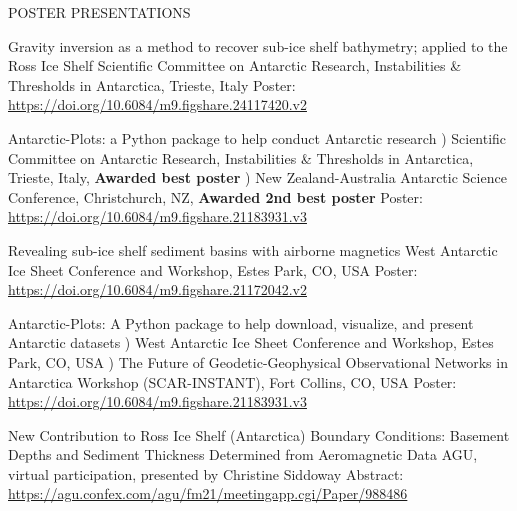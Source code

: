 \documentclass{ExpressiveResume}
\begin{document}
\noindent POSTER PRESENTATIONS \newline
\begin{cventries}

    {Gravity inversion as a method to recover sub-ice shelf bathymetry; applied to the Ross Ice Shelf}
    {Scientific Committee on Antarctic Research, Instabilities \&
        Thresholds in Antarctica, Trieste, Italy}
    {Poster: \url{https://doi.org/10.6084/m9.figshare.24117420.v2}}
    {}
    {}

    \talk{}
    {Antarctic-Plots: a Python package to help conduct Antarctic research}
    {) Scientific Committee on Antarctic Research, Instabilities \&
        Thresholds in Antarctica, Trieste, Italy,
        \textbf{Awarded best poster}
        ) New Zealand-Australia Antarctic Science Conference, Christchurch, NZ,
        \textbf{Awarded 2nd best poster}}
    {Poster: \url{https://doi.org/10.6084/m9.figshare.21183931.v3}}
    {}
    {}



    {Revealing sub-ice shelf sediment basins with airborne magnetics}
    {West Antarctic Ice Sheet Conference and Workshop, Estes Park, CO, USA}
    {Poster: \url{https://doi.org/10.6084/m9.figshare.21172042.v2}}
    {}
    {}

    \talk{} %
    {Antarctic-Plots: A Python package to help download, visualize, and present Antarctic datasets}
    {) West Antarctic Ice Sheet Conference and Workshop, Estes Park, CO, USA
        ) The Future of Geodetic-Geophysical Observational Networks in
        Antarctica Workshop (SCAR-INSTANT), Fort Collins, CO, USA
    }
    {Poster: \url{https://doi.org/10.6084/m9.figshare.21183931.v3}}
    {}
    {}

    {New Contribution to Ross Ice Shelf (Antarctica) Boundary Conditions: Basement Depths and Sediment Thickness Determined from Aeromagnetic Data}
    {AGU, virtual participation, presented by Christine Siddoway}
    {Abstract: \url{https://agu.confex.com/agu/fm21/meetingapp.cgi/Paper/988486}}
    {}
    {}


\end{cventries}
\end{document}
